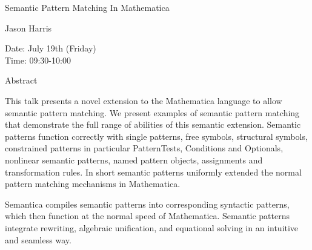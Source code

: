 \begin{center}
\LARGE
Semantic Pattern Matching In Mathematica
\end{center}

\begin{center}
\Large
Jason Harris

\end{center}

\noindent
Date:  July 19th (Friday)\\
Time:  09:30-10:00\\

\begin{center}
\large
Abstract
\end{center}

This talk presents a novel extension to the Mathematica language to allow semantic pattern
matching. We present examples of semantic pattern matching that demonstrate the full range of
abilities of this semantic extension. Semantic patterns function correctly with single patterns, free
symbols, structural symbols, constrained patterns in particular PatternTests, Conditions and
Optionals, nonlinear semantic patterns, named pattern objects, assignments and transformation
rules. In short semantic patterns uniformly extended the normal pattern matching mechanisms in
Mathematica. 

Semantica compiles semantic patterns into corresponding syntactic patterns, which then function
at the normal speed of Mathematica. Semantic patterns integrate rewriting, algebraic unification,
and equational solving in an intuitive and seamless way. 

